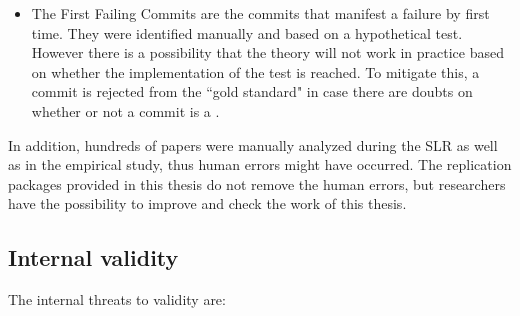 \documentclass[a4paper, 12pt]{book}
\begin{document}
\begin{enumerate}
\begin{itemize}
			\item The First Failing Commits are the commits that manifest a failure by first time. They were identified manually and based on a hypothetical test. However there is a possibility that the theory will not work in practice based on whether the implementation of the test is reached. To mitigate this, a commit is rejected from the ``gold standard" in case there are doubts on whether or not a commit is a \FFC. 
		\end{itemize}
\end{enumerate}

In addition, hundreds of papers were manually analyzed during the SLR as well as in the empirical study, thus human errors might have occurred. The replication packages provided in this thesis do not remove the human errors, but researchers have the possibility to improve and check the work of this thesis. 

\subsection{Internal validity}
The internal threats to validity are:
\end{document}
